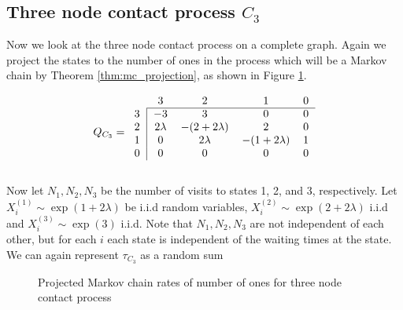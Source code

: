 \documentclass{article}
\theoremstyle{plain}
\theoremstyle{definition}
\theoremstyle{remark}
\numberwithin{equation}{section}
\begin{document}
\subsection{Three node contact process \texorpdfstring{$C_3$}{C3}}
Now we look at the three node contact process on a complete graph.
Again we project the states to the number of ones in the process which will be a Markov chain by Theorem \ref{thm:mc_projection}, as shown in Figure \ref{fig:mc_three_contact}.

\begin{equation}
Q_{C_3} = \begin{blockarray}{ccccc}
    & 3 & 2 & 1 & 0\\
    \begin{block}{c|cccc}
    \cline{2-5}
        3 & -3 & 3 & 0 & 0 \\
        2 & 2\lambda & -(2 + 2 \lambda) &
        2 & 0\\
        1 & 0 & 2\lambda & -(1 + 2\lambda) & 1\\
    0 & 0 & 0 & 0 & 0\\
    \end{block}
\end{blockarray}
\end{equation}

Now let $N_1, N_2, N_3$ be the number of visits to states 1, 2, and 3, respectively.
Let $X_i^{(1)} \sim \exp(1 + 2\lambda)$ be i.i.d random variables, $X_i^{(2)} \sim \exp(2 + 2\lambda)$ i.i.d and $X_i^{(3)} \sim \exp(3)$ i.i.d.
Note that $N_1, N_2, N_3$ are not independent of each other, but for each $i$ each state is independent of the waiting times at the state.
We can again represent $\tau_{C_3}$ as a random sum

\begin{figure}[H]
    \centering
    \caption{Projected Markov chain rates of number of ones for three node contact process}
    \label{fig:mc_three_contact}
\end{figure}
\end{document}

